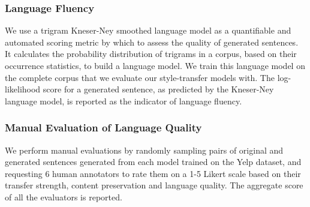 \documentclass[letterpaper]{article} %
\begin{document}
\subsubsection{Language Fluency}
We use a trigram Kneser-Ney smoothed language model \cite{kneser1995improved} as a quantifiable and automated scoring metric by which to assess the quality of generated sentences.
It calculates the probability distribution of trigrams in a corpus, based on their occurrence statistics, to build a language model.
We train this language model on the complete corpus that we evaluate our style-transfer models with.
The log-likelihood score for a generated sentence, as predicted by the Kneser-Ney language model, is reported as the indicator of language fluency.

\subsubsection{Manual Evaluation of Language Quality}
We perform manual evaluations by randomly sampling pairs of original and generated sentences generated from each model trained on the Yelp dataset, and requesting 6 human annotators to rate them on a 1-5 Likert scale \cite{stent2005evaluating} based on their transfer strength, content preservation and language quality.
The aggregate score of all the evaluators is reported.
\end{document}
